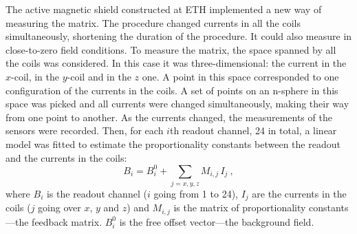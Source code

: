 The active magnetic shield constructed at ETH implemented a new way of measuring the matrix. The procedure changed currents in all the coils simultaneously, shortening the duration of the procedure. It could also measure in close-to-zero field conditions. To measure the matrix, the space spanned by all the coils was considered. In this case it was three-dimensional: the current in the $x$-coil, in the $y$-coil and in the $z$ one. A point in this space corresponded to one configuration of the currents in the coils. A set of points on an n-sphere in this space was picked and all currents were changed simultaneously, making their way from one point to another. As the currents changed, the measurements of the sensors were recorded. Then, for each $i$th readout channel, 24 in total, a linear model was fitted to estimate the proportionality constants between the readout and the currents in the coils:
\begin{equation}
  \label{eq:SFC_matrix_linear_fits}
  B_i = B_i^0 + \sum_{j=x,y,z} M_{i,j} \, I_j \ ,
\end{equation}
where $B_i$ is the readout channel ($i$ going from 1 to 24), $I_j$ are the currents in the coils ($j$ going over $x$, $y$ and $z$) and $M_{i,j}$ is the matrix of proportionality constants---the feedback matrix. $B_i^0$ is the free offset vector---the background field.

